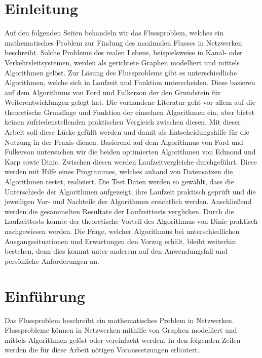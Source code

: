 \documentclass[a4paper]{llncs}
\begin{document}
\section{Einleitung}
\label{Einleitung}

Auf den folgenden Seiten behandeln wir das Flussproblem, welches ein mathematisches Problem zur Findung des maximalen Flusses in Netzwerken beschreibt.
 Solche Probleme des realen Lebens, beispielsweise in Kanal- oder Verkehrsleitsystemen, werden als gerichtete Graphen modelliert und mittels Algorithmen gelöst.
 Zur Lösung des Flussproblems gibt es unterschiedliche Algorithmen, welche sich in Laufzeit und Funktion unterscheiden. Diese basieren auf dem Algorithmus von Ford und Fulkerson der den Grundstein für Weiterentwicklungen gelegt hat.
 Die vorhandene Literatur geht vor allem auf die theoretische Grundlage und Funktion der einzelnen Algorithmen ein,  aber bietet keinen zufriedenstellenden praktischen Vergleich zwischen diesen.
 Mit dieser Arbeit soll diese Lücke gefüllt werden und damit als Entscheidungshilfe für die Nutzung in der Praxis dienen.
Basierend auf dem Algorithmus von Ford und Fulkerson untersuchen wir die beiden optimierten Algorithmen von Edmond und Karp sowie Dinic.
Zwischen diesen werden Laufzeitvergleiche durchgeführt.
Diese werden mit Hilfe eines Programmes, welches anhand von Datensätzen die Algorithmen testet, realisiert.
Die Test Daten werden so gewählt, dass die Unterschiede der Algorithmen aufgezeigt, ihre Laufzeit praktisch geprüft und die jeweiligen Vor- und Nachteile der Algorithmen ersichtlich werden. Anschließend werden die gesammelten Resultate der Laufzeittests verglichen.
Durch die Laufzeittests konnte der theoretische Vorteil des Algorithmus von Dinic praktisch nachgewiesen werden.
 Die Frage, welcher Algorithmus bei unterschiedlichen Ausgangssituationen und Erwartungen den Vorzug erhält, bleibt weiterhin bestehen, denn dies kommt unter anderem auf den Anwendungsfall und persönliche Anforderungen an.

\section{Einführung}
\label{Einfuehrung}

Das Flussproblem beschreibt ein mathematisches Problem in Netzwerken.\\
Flussprobleme können in Netzwerken mithilfe von Graphen modelliert und mittels Algorithmen gelöst oder vereinfacht werden. In den folgenden Zeilen werden die für diese Arbeit nötigen Voraussetzungen erläutert.
\end{document}
